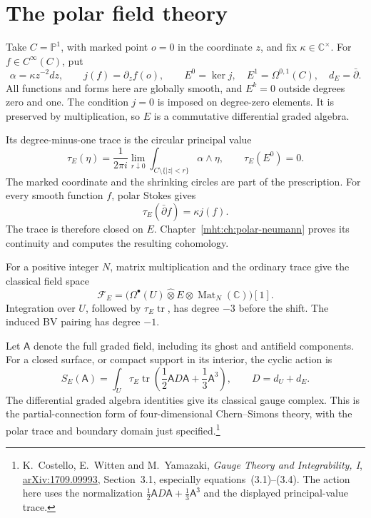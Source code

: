 \section{The polar field theory}

Take $C=\mathbb P^1$, with marked point $o=0$ in the coordinate $z$,
and fix $\kappa\in\mathbb C^\times$. For $f\in C^\infty(C)$, put
\[
 \alpha=\kappa z^{-2}dz,\qquad j(f)=\partial_zf(o),
 \qquad
 E^0=\ker j,\quad E^1=\Omega^{0,1}(C),\quad d_E=\bar\partial.
\]
All functions and forms here are globally smooth, and $E^k=0$ outside
degrees zero and one. The condition $j=0$
is imposed on degree-zero elements. It is preserved by multiplication,
so $E$ is a commutative differential graded algebra.

Its degree-minus-one
trace is the circular principal value
\[
 \tau_E(\eta)=\frac1{2\pi i}
       \lim_{r\downarrow0}\int_{C\setminus\{|z|<r\}}\alpha\wedge\eta,
 \qquad \tau_E(E^0)=0.
\]
The marked coordinate and the shrinking circles are part of the
prescription. For every smooth function $f$, polar Stokes gives
\begin{equation}\label{mht:eq:entrance-polar-stokes}
 \tau_E(\bar\partial f)=\kappa j(f).
\end{equation}
The trace is therefore closed on $E$. Chapter~\ref{mht:ch:polar-neumann}
proves its continuity and computes the resulting cohomology.

For a positive integer $N$, matrix multiplication and the ordinary
trace give the classical field space
\begin{equation}\label{mht:eq:entrance-polar-fields}
 \mathcal F_E
   =\bigl(\Omega^\bullet(U)\widehat\otimes E
                         \otimes\operatorname{Mat}_N(\mathbb C)\bigr)[1].
\end{equation}
Integration over $U$, followed by $\tau_E\operatorname{tr}$, has degree
$-3$ before the shift. The induced BV pairing has degree $-1$.

Let $\mathsf A$ denote the full graded field, including its ghost and
antifield components. For a closed surface, or compact support in its
interior, the cyclic action is
\begin{equation}\label{mht:eq:entrance-polar-action}
 S_E(\mathsf A)=\int_U\tau_E\operatorname{tr}
       \left(\frac12\mathsf A D\mathsf A+\frac13\mathsf A^3\right),
 \qquad D=d_U+d_E.
\end{equation}
The differential graded algebra identities give its classical gauge
complex. This is the partial-connection form of four-dimensional
Chern--Simons theory, with the polar trace and boundary domain just
specified.\footnote{K.~Costello, E.~Witten and M.~Yamazaki,
\emph{Gauge Theory and Integrability, I},
\href{https://arxiv.org/abs/1709.09993}{arXiv:1709.09993},
Section~3.1, especially equations~(3.1)--(3.4). The action here uses
the normalization $\frac12\mathsf A D\mathsf A+\frac13\mathsf A^3$
and the displayed principal-value trace.}

